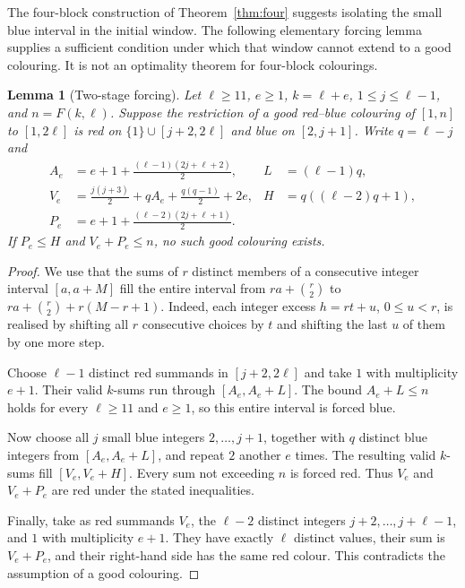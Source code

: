\documentclass[11pt]{amsart}
\newtheorem{lemma}[theorem]{Lemma}
\theoremstyle{definition}
\begin{document}
The four-block construction of Theorem~\ref{thm:four} suggests isolating the
small blue interval in the initial window. The following elementary forcing
lemma supplies a sufficient condition under which that window cannot extend
to a good colouring. It is not an optimality theorem for four-block colourings.

\begin{lemma}[Two-stage forcing]\label{lem:two-stage-forcing}
Let $\ell\ge 11$, $e\ge1$, $k=\ell+e$, $1\le j\le\ell-1$, and $n=F(k,\ell)$.
Suppose the restriction of a good red--blue colouring of $[1,n]$ to
$[1,2\ell]$ is red on $\{1\}\cup[j+2,2\ell]$ and blue on $[2,j+1]$.
Write $q=\ell-j$ and
\[
\begin{aligned}
 A_e&=e+1+\frac{(\ell-1)(2j+\ell+2)}2, &
 L&=(\ell-1)q,\\
 V_e&=\frac{j(j+3)}2+qA_e+\frac{q(q-1)}2+2e, &
 H&=q((\ell-2)q+1),\\
 P_e&=e+1+\frac{(\ell-2)(2j+\ell+1)}2.
\end{aligned}
\]
If $P_e\le H$ and $V_e+P_e\le n$, no such good colouring exists.
\end{lemma}

\begin{proof}
We use that the sums of $r$ distinct members of a consecutive integer
interval $[a,a+M]$ fill the entire interval from
$ra+\binom r2$ to $ra+\binom r2+r(M-r+1)$.
Indeed, each integer excess $h=rt+u$, $0\le u<r$, is realised by shifting
all $r$ consecutive choices by $t$ and shifting the last $u$ of them by
one more step.

Choose $\ell-1$ distinct red summands in $[j+2,2\ell]$ and take $1$
with multiplicity $e+1$. Their valid $k$-sums run through
$[A_e,A_e+L]$. The bound $A_e+L\le n$ holds for every
$\ell\ge11$ and $e\ge1$, so this entire interval is forced blue.

Now choose all $j$ small blue integers $2,\ldots,j+1$, together with
$q$ distinct blue integers from $[A_e,A_e+L]$, and repeat $2$ another
$e$ times. The resulting valid $k$-sums fill $[V_e,V_e+H]$.
Every sum not exceeding $n$ is forced red. Thus $V_e$ and
$V_e+P_e$ are red under the stated inequalities.

Finally, take as red summands $V_e$, the $\ell-2$ distinct integers
$j+2,\ldots,j+\ell-1$, and $1$ with multiplicity $e+1$.
They have exactly $\ell$ distinct values, their sum is $V_e+P_e$,
and their right-hand side has the same red colour. This contradicts
the assumption of a good colouring.
\end{proof}
\end{document}
